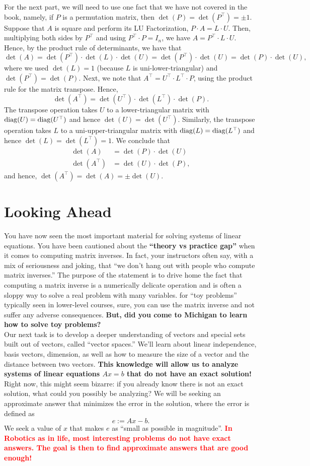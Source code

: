 For the next part, we will need to use one fact that we have not covered in the book, namely, if $P$ is a permutation matrix, then $\det(P)=\det(P^\top) = \pm 1.$ Suppose that $A$ is square and perform its LU Factorization, $P\cdot A = L \cdot U$. Then, multiplying both sides by $P^\top$ and using $P^\top \cdot P = I_n$, we have $ A = P^\top \cdot L \cdot U.$ Hence, by the product rule of determinants, we have that
$$\det(A) = \det(P^\top) \cdot \det(L) \cdot \det(U) = \det(P^\top) \cdot\det(U) = \det(P)  \cdot\det(U) , $$
where we used $\det(L)=1$ (because $L$ is uni-lower-triangular) and $\det(P^\top)=\det(P)$. Next, we note that $A^\top = U^\top \cdot L^\top \cdot P$, using the product rule for the matrix transpose. Hence, 
$$\det(A^\top) = \det(U^\top) \cdot \det(L^\top) \cdot \det(P).$$
The transpose operation takes $U$ to a lower-triangular matrix with $\mathrm{diag}(U) = \mathrm{diag}(U^\top)$ and hence $\det(U) = \det(U^\top)$. Similarly, the transpose operation takes $L$ to a uni-upper-triangular matrix with $\mathrm{diag}(L) = \mathrm{diag}(L^\top)$ and hence $\det(L) = \det(L^\top)=1$. We conclude that 
\begin{align*}
\det(A) &= \det(P) \cdot \det(U) \\
\det(A^\top) &= \det(U) \cdot \det(P),
\end{align*}
and hence, $\det(A^\top) = \det(A) = \pm \det(U).$

\section{Looking Ahead}

You have now seen the most important material for solving systems of linear equations. You have been cautioned about the \textbf{``theory vs practice gap''} when it comes to computing matrix inverses. In fact, your instructors often say, with a mix of seriousness and joking, that ``we don't hang out with people who compute matrix inverses.'' The purpose of the statement is to drive home the fact that computing a matrix inverse is a numerically delicate operation and is often a sloppy way to solve a real problem with many variables. for ``toy problems'' typically seen in lower-level courses, sure, you can use the matrix inverse and not suffer any adverse consequences. \textbf{But, did you come to Michigan to learn how to solve toy problems?} \\

Our next task is to develop a deeper understanding of vectors and special sets built out of vectors, called ``vector spaces.'' We'll learn about linear independence, basis vectors, dimension, as well as how to measure the size of a vector and the distance between two vectors. \textbf{This knowledge will allow us to analyze systems of linear equations $Ax=b$ that do not have an exact solution!} Right now, this might seem bizarre: if you already know there is not an exact solution, what could you possibly be analyzing? We will be seeking an approximate answer that minimizes the error in the solution, where the error is defined as
$$e:= Ax-b.$$
We seek a value of $x$ that makes $e$ as ``small as possible in magnitude''. \textcolor{red}{\bf In Robotics as in life, most interesting problems do not have exact answers. The goal is then to find approximate answers that are good enough!} 